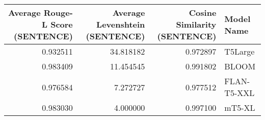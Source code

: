 \begin{tabular}{rrrl}
\toprule
Average Rouge-L Score (SENTENCE) & Average Levenshtein (SENTENCE) & Cosine Similarity (SENTENCE) & Model Name \\
\midrule
0.932511 & 34.818182 & 0.972897 & T5Large \\
0.983409 & 11.454545 & 0.991802 & BLOOM \\
0.976584 & 7.272727 & 0.977512 & FLAN-T5-XXL \\
0.983030 & 4.000000 & 0.997100 & mT5-XL \\
\bottomrule
\end{tabular}

